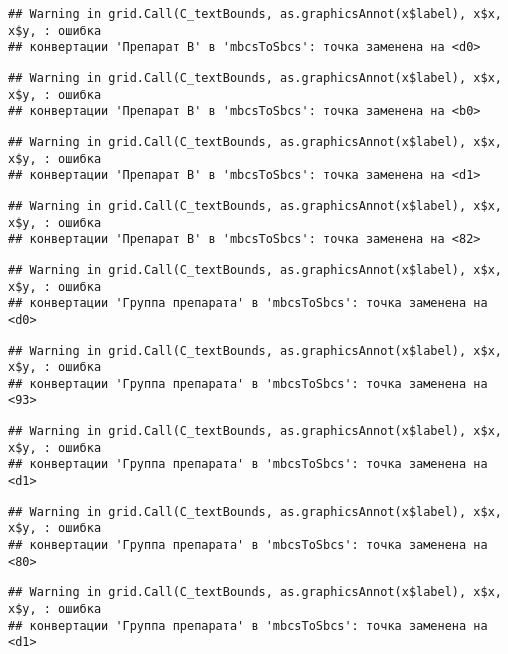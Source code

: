\documentclass[
]{article}
\begin{document}
\begin{verbatim}
## Warning in grid.Call(C_textBounds, as.graphicsAnnot(x$label), x$x, x$y, : ошибка
## конвертации 'Препарат B' в 'mbcsToSbcs': точка заменена на <d0>
\end{verbatim}

\begin{verbatim}
## Warning in grid.Call(C_textBounds, as.graphicsAnnot(x$label), x$x, x$y, : ошибка
## конвертации 'Препарат B' в 'mbcsToSbcs': точка заменена на <b0>
\end{verbatim}

\begin{verbatim}
## Warning in grid.Call(C_textBounds, as.graphicsAnnot(x$label), x$x, x$y, : ошибка
## конвертации 'Препарат B' в 'mbcsToSbcs': точка заменена на <d1>
\end{verbatim}

\begin{verbatim}
## Warning in grid.Call(C_textBounds, as.graphicsAnnot(x$label), x$x, x$y, : ошибка
## конвертации 'Препарат B' в 'mbcsToSbcs': точка заменена на <82>
\end{verbatim}

\begin{verbatim}
## Warning in grid.Call(C_textBounds, as.graphicsAnnot(x$label), x$x, x$y, : ошибка
## конвертации 'Группа препарата' в 'mbcsToSbcs': точка заменена на <d0>
\end{verbatim}

\begin{verbatim}
## Warning in grid.Call(C_textBounds, as.graphicsAnnot(x$label), x$x, x$y, : ошибка
## конвертации 'Группа препарата' в 'mbcsToSbcs': точка заменена на <93>
\end{verbatim}

\begin{verbatim}
## Warning in grid.Call(C_textBounds, as.graphicsAnnot(x$label), x$x, x$y, : ошибка
## конвертации 'Группа препарата' в 'mbcsToSbcs': точка заменена на <d1>
\end{verbatim}

\begin{verbatim}
## Warning in grid.Call(C_textBounds, as.graphicsAnnot(x$label), x$x, x$y, : ошибка
## конвертации 'Группа препарата' в 'mbcsToSbcs': точка заменена на <80>
\end{verbatim}

\begin{verbatim}
## Warning in grid.Call(C_textBounds, as.graphicsAnnot(x$label), x$x, x$y, : ошибка
## конвертации 'Группа препарата' в 'mbcsToSbcs': точка заменена на <d1>
\end{verbatim}
\end{document}

